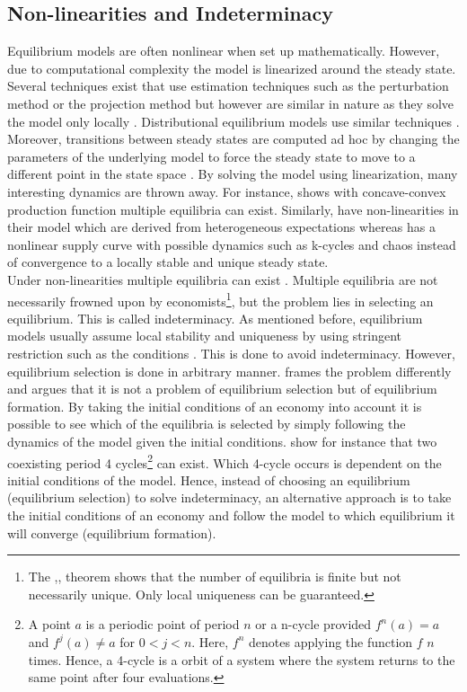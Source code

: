 \subsection{Non-linearities and Indeterminacy}
Equilibrium models are often nonlinear when set up mathematically. However, due to computational complexity the model is linearized around the steady state. Several techniques exist that use estimation techniques such as the perturbation method or the projection method but however are similar in nature as they solve the model only locally \citep{den_haan_comparison_2010}. Distributional equilibrium models use similar techniques \citep{marimon_computation_2001}. Moreover, transitions between steady states are computed ad hoc by changing the parameters of the underlying model to force the steady state to move to a different point in the state space \citep{marimon_computation_2001}. By solving the model using linearization, many interesting dynamics are thrown away. For instance, \cite{skiba_optimal_1978} shows with concave-convex production function multiple equilibria can exist. Similarly, \cite{brock_rational_1997} have non-linearities in their model which are derived from heterogeneous expectations whereas \cite{hommes_dynamics_1994} has a nonlinear supply curve with possible dynamics such as k-cycles and chaos instead of convergence to a locally stable and unique steady state.\\

 Under non-linearities multiple equilibria can exist \citep{hommes_behavioral_2013}. Multiple equilibria are not necessarily frowned upon by economists\footnote{The \cite{sonnenschein_market_1972},\cite{mantel_characterization_1974},\cite{debreu_economies_1970} theorem shows that the number of equilibria is finite but not necessarily unique. Only local uniqueness can be guaranteed.}, but the problem lies in selecting an equilibrium. This is called indeterminacy. As mentioned before, equilibrium models usually assume local stability and uniqueness by using stringent restriction such as the \cite{blanchard_solution_1980} conditions \citep{farmer_indeterminacy_2020}. This is done to avoid indeterminacy. However, equilibrium selection is done in arbitrary manner. \cite{arthur_chapter_2006} frames the problem differently and argues that it is not a problem of equilibrium selection but of equilibrium formation. By taking the initial conditions of an economy into account it is possible to see which of the equilibria is selected by simply following the dynamics of the model given the initial conditions. \cite{brock_rational_1997} show for instance that two coexisting period 4 cycles\footnote{A point $a$ is a periodic point of period $n$ or a n-cycle provided $f^n(a)=a$ and $f^j(a) \neq a$ for $0<j<n$. Here, $f^n$ denotes applying the function $f$ $n$ times. Hence, a 4-cycle is a orbit of a system where the system returns to the same point after four evaluations.} can exist. Which 4-cycle occurs is dependent on the initial conditions of the model. Hence, instead of choosing an equilibrium (equilibrium selection) to solve indeterminacy, an alternative approach is to take the initial conditions of an economy and follow the model to which equilibrium it will converge (equilibrium formation).\\
 
